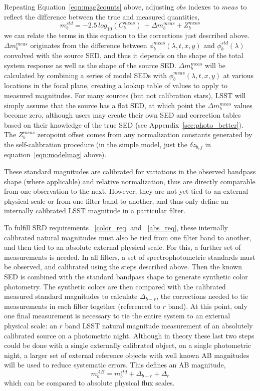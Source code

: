 \documentclass[12pt,preprint]{aastex}
\begin{document}
Repeating Equation~\ref{eqn:mag2counts} above, adjusting ${obs}$ indexes to ${meas}$ to 
reflect the difference between the true and measured quantities,
\begin{equation}
\label{eqn:magsFromCounts}
m_b^{std} = -2.5\,log_{10}(C_b^{meas}) \, + \Delta m_b^{meas} + Z_b^{meas} 
\end{equation}
we can relate the terms in this equation to the corrections just
described above.  $\Delta m_b^{meas}$ originates from the difference
between $\phi_b^{meas}(\lambda,t,x,y)$ and $\phi_b^{std}(\lambda)$
convolved with the source SED, and thus it depends on the shape of the total
system response as well as the shape of the source SED. $\Delta
m_b^{meas}$ will be calculated by combining a series of model SEDs
with $\phi_b^{meas}(\lambda,t,x,y)$ at various locations in the focal
plane, creating a lookup table of values to apply to measured
magnitudes.  For many sources (but not calibration stars), LSST will
simply assume that the source has a flat SED, at which point the
$\Delta m_b^{meas}$ values become zero, although users may create
their own SED and correction tables based on their knowledge of the
true SED (see Appendix~\ref{sec:photo_better}).  The $Z_b^{meas}$
zeropoint offset comes from any normalization constants generated by the 
self-calibration procedure (in the simple model, just the $\delta z_{b,j}$ in
equation~\ref{eqn:modelmag} above). 

These standard magnitudes are calibrated for variations in the
observed bandpass shape (where applicable) and relative normalization,
thus are directly comparable from one observation to the
next. However, they are not yet tied to an external physical scale or
from one filter band to another, and thus only define an internally
calibrated LSST magnitude in a particular filter.

To fulfill SRD requirements ~\ref{color_req} and ~\ref{abs_req}, these
internally calibrated natural magnitudes must also be tied from one filter
band to another, and then tied to an absolute external physical scale.
For this, a further set of measurements is needed. In all filters, a
set of spectrophotometric standards must be observed, and calibrated using
the steps described above. Then the known SED is combined with
the standard bandpass shape to generate synthetic color
photometry. The synthetic colors are then compared with the
calibrated measured standard magnitudes to calculate $\Delta_{b-r}$,
the corrections needed to tie measurements in each filter together
(referenced to $r$ band).  At this point, only one final measurement
is necessary to tie the entire system to an external physical scale:
an $r$ band LSST natural magnitude measurement of an absolutely
calibrated source on a photometric night. Although in theory these
last two steps could be done with a single externally calibrated
object, on a single photometric night, a larger set of external
reference objects with well known AB magnitudes will be used to reduce
systematic errors. This defines an AB magnitude,
\begin{equation}
\label{eqn:extmags}
m_b^{AB} = m_b^{std}  + \Delta_{b-r} + \Delta_r
\end{equation}
which can be compared to absolute physical flux scales. 
\end{document}
